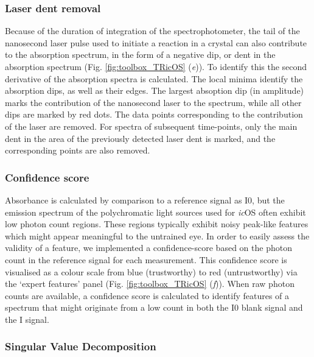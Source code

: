 \subsubsection{Laser dent removal}

Because of the duration of integration of the spectrophotometer, the tail of the nanosecond laser pulse used to initiate a reaction in a crystal can also contribute to the absorption spectrum, in the form of a negative dip, or dent in the absorption spectrum (Fig. \ref{fig:toolbox_TRicOS} (\textit{e})). To identify this the second derivative of the absorption spectra is calculated. The local minima identify the absorption dips, as well as their edges. The largest absoption dip (in amplitude) marks the contribution of the nanosecond laser to the spectrum, while all other dips are marked by red dots. The data points corresponding to the contribution of the laser are removed. For spectra of subsequent time-points, only the main dent in the area of the previously detected laser dent is marked, and the corresponding points are also removed.

\subsubsection{Confidence score}

Absorbance is calculated by comparison to a reference signal as I0, but the emission spectrum of the polychromatic light sources used for \textit{ic}OS often exhibit low photon count regions. These regions typically exhibit noisy peak-like features which might appear meaningful to the untrained eye. In order to easily assess the validity of a feature, we implemented a confidence-score based on the photon count in the reference signal for each measurement. This confidence score is visualised as a colour scale from blue (trustworthy) to red (untrustworthy) via the ‘expert features’ panel (Fig. \ref{fig:toolbox_TRicOS} (\textit{f})). When raw photon counts are available, a confidence score is calculated to identify features of a spectrum that might originate from a low count in both the I0 blank signal and the I signal. 

\subsubsection{Singular Value Decomposition}


